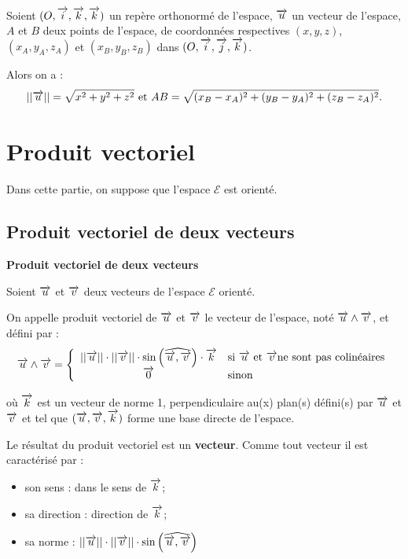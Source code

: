 \documentclass[10pt,oneside]{article}
\begin{document}
\begin{coro}

Soient $(O, \overrightarrow{i}, \overrightarrow{k}, \overrightarrow{k})$ un repère orthonormé de l'espace, $\overrightarrow{u}$ un vecteur de l'espace, $A$ et $B$ deux points de l'espace, de coordonnées respectives $(x,y,z)$, $(x_A,y_A,z_A)$ et $(x_B,y_B,z_B)$ dans $(O, \overrightarrow{i}, \overrightarrow{j}, \overrightarrow{k})$.

Alors on a :
$$||\overrightarrow{u}||=\sqrt{x^2+y^2+z^2}  \text{ et } AB=\sqrt{(x_B-x_A)^2+(y_B-y_A)^2+(z_B-z_A)^2}.$$
\end{coro}

\section{Produit vectoriel}

Dans cette partie, on suppose que l'espace $\mathcal{E}$ est orienté.

\subsection{Produit vectoriel de deux vecteurs}

\begin{defi}
\textbf{Produit vectoriel de deux vecteurs}

Soient $\overrightarrow{u}$ et $\overrightarrow{v}$ deux vecteurs de l'espace $\mathcal{E}$ orienté.

On appelle produit vectoriel de $\overrightarrow{u}$ et $\overrightarrow{v}$ le vecteur de l'espace, noté $\overrightarrow{u} \wedge \overrightarrow{v}$, et défini par :
$$\overrightarrow{u}\wedge \overrightarrow{v}=\left\{
\begin{array}{cl}
||\overrightarrow{u}||\cdot ||\overrightarrow{v}|| \cdot \sin\left(\widehat{\overrightarrow{u}, \overrightarrow{v}}\right)\cdot\overrightarrow{k} & \text{si } \overrightarrow{u} \text{ et } \overrightarrow{v} \text{ne sont pas colinéaires}\\
\overrightarrow{0} & \text{sinon}
\end{array}
\right.$$

où $\overrightarrow{k}$ est un vecteur de norme 1, perpendiculaire au(x) plan(s) défini(s) par $\overrightarrow{u}$ et $\overrightarrow{v}$ et tel que $(\overrightarrow{u},\overrightarrow{v}, \overrightarrow{k})$ forme une base directe de l'espace.

\end{defi}

\begin{rem}
Le résultat du produit vectoriel est un \textbf{vecteur}. Comme tout vecteur il est caractérisé par :
\begin{itemize}
\item son sens : dans le sens de $\overrightarrow{k}$;
\item sa direction : direction de $\overrightarrow{k}$;
\item sa norme : $||\overrightarrow{u}||\cdot ||\overrightarrow{v}|| \cdot \sin\left(\widehat{\overrightarrow{u}, \overrightarrow{v}}\right)$
\end{itemize}
\end{rem}
\end{document}
